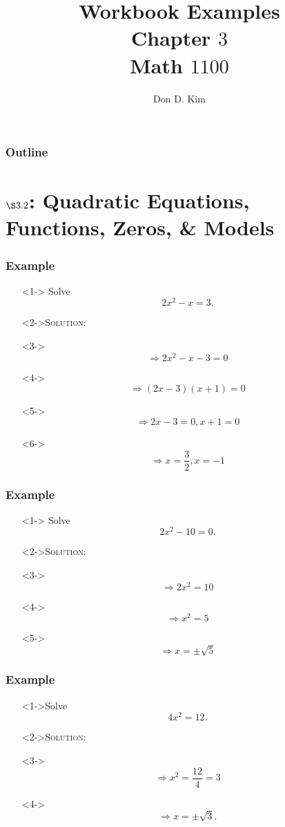 \documentclass[handout]{beamer}
\title{Workbook Examples \\ Chapter $3$ \\ Math $1100$}
\author{Don D. Kim}
\date{\datefmt{\year}{\month}{\day}}
\begin{document}
\begin{frame}
	\titlepage
\end{frame}

\begin{frame}
	\frametitle{Outline}
	\tableofcontents
\end{frame}

\section{$\S 3.2$: Quadratic Equations, Functions, Zeros, \& Models} 

\begin{frame}
	\frametitle{Example} 
	\begin{enumerate}
		\item[]<1-> Solve \[ 2x^{2}-x=3. \]  
		\item[]<2->\textsc{Solution:} 
		\item[]<3-> \[ \Rightarrow 2x^{2}-x-3=0 \]
		\item[]<4->\[ \Rightarrow (2x-3)(x+1)=0 \]
		\item[]<5->\[ \Rightarrow 2x-3=0, x+1=0 \]
		\item[]<6->\[ \Rightarrow x=\frac{3}{2}, x=-1\] 
	\end{enumerate}
\end{frame}

\begin{frame}
	\frametitle{Example}
	\begin{enumerate}
		\item[]<1-> Solve \[ 2x^{2}-10=0. \]
		\item[]<2->\textsc{Solution:}
		\item[]<3->\[ \Rightarrow 2x^{2}=10\]
		\item[]<4->\[\Rightarrow x^{2}=5\]
		\item[]<5->\[ \Rightarrow x=\pm \sqrt{5} \]
	\end{enumerate}
\end{frame}

\begin{frame}
	\frametitle{Example} 
	\begin{enumerate} 
		\item[]<1->Solve \[ 4x^{2}=12. \] 
		\item[]<2->\textsc{Solution:} 
		\item[]<3-> \[ \Rightarrow x^{2}=\frac{12}{4}=3 \]
		\item[]<4->\[ \Rightarrow x=\pm \sqrt{3}. \]
	\end{enumerate} 
\end{frame}
\end{document}
